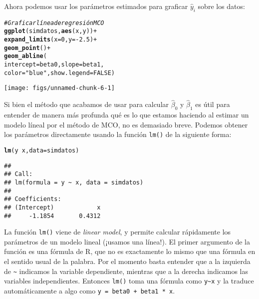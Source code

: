 \documentclass{report}\usepackage[]{graphicx}\usepackage[]{color}
\makeatletter
\newcommand{\hlnum}[1]{\textcolor[rgb]{0.686,0.059,0.569}{#1}}%
\newcommand{\hlstr}[1]{\textcolor[rgb]{0.192,0.494,0.8}{#1}}%
\newcommand{\hlcom}[1]{\textcolor[rgb]{0.678,0.584,0.686}{\textit{#1}}}%
\newcommand{\hlopt}[1]{\textcolor[rgb]{0,0,0}{#1}}%
\newcommand{\hlstd}[1]{\textcolor[rgb]{0.345,0.345,0.345}{#1}}%
\newcommand{\hlkwc}[1]{\textcolor[rgb]{0.333,0.667,0.333}{#1}}%
\newcommand{\hlkwd}[1]{\textcolor[rgb]{0.737,0.353,0.396}{\textbf{#1}}}%
\newenvironment{kframe}{%
 \def\at@end@of@kframe{}%
 \ifinner\ifhmode%
  \def\at@end@of@kframe{\end{minipage}}%
  \begin{minipage}{\columnwidth}%
 \fi\fi%
 \def\FrameCommand##1{\hskip\@totalleftmargin \hskip-\fboxsep
 \colorbox{shadecolor}{##1}\hskip-\fboxsep
     \hskip-\linewidth \hskip-\@totalleftmargin \hskip\columnwidth}%
 \MakeFramed {\advance\hsize-\width
   \@totalleftmargin\z@ \linewidth\hsize
   \@setminipage}}%
 {\par\unskip\endMakeFramed%
 \at@end@of@kframe}
\newenvironment{knitrout}{}{} %
\newcommand*{\eng}[1]{\textsl{#1}}
\makeatother
\begin{document}
Ahora podemos usar los parámetros estimados para graficar $\hat y_i$ sobre los datos:

\begin{knitrout}
\color{fgcolor}\begin{kframe}
\begin{alltt}
\hlcom{# Graficar línea de regresión MCO}
\hlkwd{ggplot}\hlstd{(simdatos,} \hlkwd{aes}\hlstd{(x,y))} \hlopt{+}
  \hlkwd{expand_limits}\hlstd{(}\hlkwc{x} \hlstd{=} \hlnum{0}\hlstd{,} \hlkwc{y} \hlstd{=} \hlopt{-}\hlnum{2.5}\hlstd{)} \hlopt{+}
  \hlkwd{geom_point}\hlstd{()} \hlopt{+}
  \hlkwd{geom_abline}\hlstd{(}
    \hlkwc{intercept} \hlstd{= beta0,} \hlkwc{slope} \hlstd{= beta1,}
    \hlkwc{color} \hlstd{=} \hlstr{"blue"}\hlstd{,} \hlkwc{show.legend} \hlstd{=} \hlnum{FALSE} \hlstd{)}
\end{alltt}
\end{kframe}

{\centering \texttt{[image: figs/unnamed-chunk-6-1]} 

}



\end{knitrout}

Si bien el método que acabamos de usar para calcular $\hat\beta_0$ y $\hat\beta_1$ es útil para entender de manera más profunda qué es lo que estamos haciendo al estimar un modelo líneal por el método de MCO, no es demasiado breve. Podemos obtener los parámetros directamente usando la función \verb|lm()| de la siguiente forma:

\begin{knitrout}
\color{fgcolor}\begin{kframe}
\begin{alltt}
\hlkwd{lm}\hlstd{(y} \hlopt{~} \hlstd{x,} \hlkwc{data} \hlstd{= simdatos)}
\end{alltt}
\begin{verbatim}
## 
## Call:
## lm(formula = y ~ x, data = simdatos)
## 
## Coefficients:
## (Intercept)            x  
##     -1.1854       0.4312
\end{verbatim}
\end{kframe}
\end{knitrout}

La función \verb|lm()| viene de \eng{linear model}, y permite calcular rápidamente los parámetros de un modelo lineal (¡usamos una línea!). El primer argumento de la función es una fórmula de R, que no es exactamente lo mismo que una fórmula en el sentido usual de la palabra. Por el momento basta entender que a la izquierda de \verb|~| indicamos la variable dependiente, mientras que a la derecha indicamos las variables independientes. Entonces \verb|lm()| toma una fórmula como \verb|y~x| y la traduce automáticamente a algo como \verb|y = beta0 + beta1 * x|.
\end{document}
